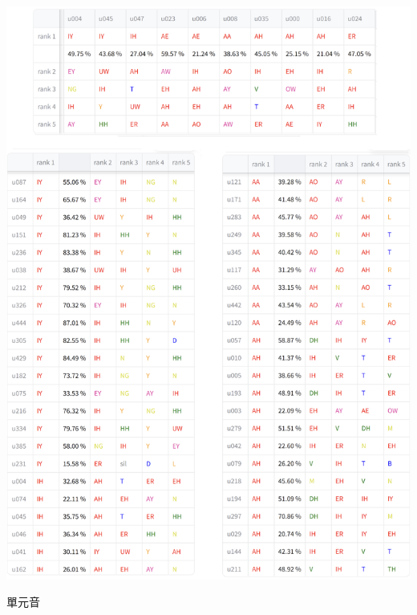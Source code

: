 {        \begin{table}
            \ContinuedFloat
            \centering
            \begin{subtable}{\textwidth}
                \centering
                \includegraphics[width=0.8\linewidth]{figures/ch4figs/vow_phn.png}
                \caption{單元音}
                \label{subtabfig:hub-u050-ap0500-vowobs}
            \end{subtable}

            \label{tabfig:hub-u050-phnobserver--3}
        \end{table}
    }

